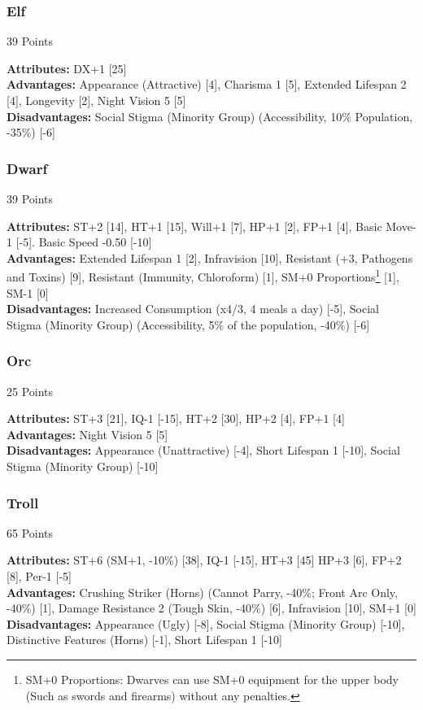 \begin{multicols*}{3}
	\subsubsection*{Elf}
	\begin{flushright}
		39 Points
	\end{flushright}
	\textbf{Attributes:} 
	DX+1 [25]
	\\\textbf{Advantages:} 
	Appearance (Attractive) [4], Charisma 1 [5], Extended Lifespan 2 [4], Longevity [2], Night Vision 5 [5]
	\\\textbf{Disadvantages:} 
	Social Stigma (Minority Group) (Accessibility, 10\% Population, -35\%) [-6]
	
	\subsubsection*{Dwarf}
	\begin{flushright}
		39 Points
	\end{flushright}
	\textbf{Attributes:}
	ST+2 [14], HT+1 [15], Will+1 [7], HP+1 [2], FP+1 [4], Basic Move-1 [-5]. Basic Speed -0.50 [-10]
	\\\textbf{Advantages:} 
	Extended Lifespan 1 [2], Infravision [10], Resistant (+3, Pathogens and Toxins) [9], Resistant (Immunity, Chloroform) [1], SM+0 Proportions\footnote{SM+0 Proportions: Dwarves can use SM+0 equipment for the upper body (Such as swords and firearms) without any penalties.} [1], SM-1 [0]
	\\\textbf{Disadvantages:} 
	Increased Consumption (x4/3, 4 meals a day) [-5], Social Stigma (Minority Group) (Accessibility, 5\% of the population, -40\%) [-6]
	
	\subsubsection*{Orc}
	\begin{flushright}
		25 Points
	\end{flushright}
	\textbf{Attributes:}
	ST+3 [21], IQ-1 [-15], HT+2 [30], HP+2 [4], FP+1 [4]
	\\\textbf{Advantages:} 
	Night Vision 5 [5]
	\\\textbf{Disadvantages:} 
	Appearance (Unattractive) [-4], Short Lifespan 1 [-10], Social Stigma (Minority Group) [-10]
	
	\subsubsection*{Troll}
	\begin{flushright}
		65 Points
	\end{flushright}
	\textbf{Attributes:}
	ST+6 (SM+1, -10\%) [38], IQ-1 [-15], HT+3 [45] HP+3 [6], FP+2 [8], Per-1 [-5]
	\\\textbf{Advantages:} 
	Crushing Striker (Horns) (Cannot Parry, -40\%; Front Arc Only, -40\%) [1], Damage Resistance 2 (Tough Skin, -40\%) [6], Infravision [10], SM+1 [0]
	\\\textbf{Disadvantages:} 
	Appearance (Ugly) [-8], Social Stigma (Minority Group) [-10], Distinctive Features (Horns) [-1], Short Lifespan 1 [-10]
	

\end{multicols*}

